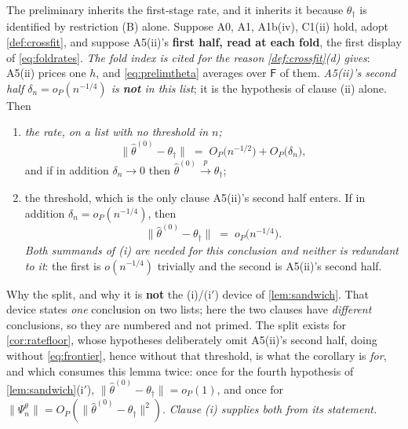 \begin{lemma}\label{lem:prelimtheta}
The preliminary inherits the first-stage rate, and it inherits it because $\theta_\dagger$ is identified by
restriction (B) alone.
Suppose A0, A1, A1b(iv), C1(ii) hold, adopt \cref{def:crossfit}, and suppose A5(ii)'s \textbf{first half,
read at each fold}, the first display of \eqref{eq:foldrates}. \emph{The fold index is cited for the
reason \cref{def:crossfit}(d) gives}: A5(ii) prices one $h$, and \eqref{eq:prelimtheta} averages over
$\mathsf F$ of them. \emph{A5\textup{(ii)}'s second half $\delta_n=o_P(n^{-1/4})$ is \textbf{not} in this
list}; it is the hypothesis of clause \textup{(ii)} alone. Then
\begin{enumerate}
\item[(i)] \emph{the rate, on a list with no threshold in $n$;}
\begin{equation}\label{eq:prelimthetarate}
\big\|\hat\theta^{(0)}-\theta_\dagger\big\|\;=\;O_P\big(n^{-1/2}\big)+O_P\big(\delta_n\big) ,
\end{equation}
and if in addition $\delta_n\to0$ then $\hat\theta^{(0)}\xrightarrow{p}\theta_\dagger$;
\item[(ii)] the threshold, which is the only clause A5\textup{(ii)}'s second half enters. If in
addition $\delta_n=o_P(n^{-1/4})$, then
\begin{equation}\label{eq:prelimthetathresh}
\big\|\hat\theta^{(0)}-\theta_\dagger\big\|\;=\;o_P\big(n^{-1/4}\big) .
\end{equation}
\emph{Both summands of \textup{(i)} are needed for this conclusion and neither is redundant to it}: the
first is $o(n^{-1/4})$ trivially and the second is A5\textup{(ii)}'s second half.
\end{enumerate}
Why the split, and why it is \textbf{not} the \textup{(i)}/\textup{(i$'$)} device of
\cref{lem:sandwich}. That device states \emph{one} conclusion on two lists; here the two clauses have
\emph{different} conclusions, so they are numbered and not primed. The split exists for
\cref{cor:ratefloor}, whose hypotheses deliberately omit A5(ii)'s second half, doing without
\eqref{eq:frontier}, hence without that threshold, is what the corollary is \emph{for}, and which
consumes this lemma twice: once for the fourth hypothesis of \cref{lem:sandwich}\textup{(i$'$)},
$\|\hat\theta^{(0)}-\theta_\dagger\|=o_P(1)$, and once for
$\|\Psi^{\theta}_n\|=O_P(\|\hat\theta^{(0)}-\theta_\dagger\|^{2})$. \emph{Clause \textup{(i)} supplies both
from its statement.}

\end{lemma}
